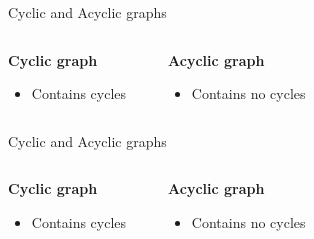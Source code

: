 \documentclass[compress]{beamer}
\begin{document}
\begin{frame}{Cyclic and Acyclic graphs}
  \begin{columns}
    \begin{block}{\textbf{Cyclic graph}}
      \begin{itemize}
        \item Contains cycles
      \end{itemize}
    \end{block}
    \begin{center}
    
  \end{center}
    \begin{block}{\textbf{Acyclic graph}}
      \begin{itemize}
        \item Contains no cycles
      \end{itemize}
    \end{block}
    \begin{center}
    
    \end{center}
  \end{columns}
\end{frame}

\begin{frame}{Cyclic and Acyclic graphs}
  \begin{columns}
    \begin{block}{\textbf{Cyclic graph}}
      \begin{itemize}
        \item Contains cycles
      \end{itemize}
    \end{block}
    \begin{center}
    
  \end{center}
    \begin{block}{\textbf{Acyclic graph}}
      \begin{itemize}
        \item Contains no cycles
      \end{itemize}
    \end{block}
    \begin{center}
    
    \end{center}
  \end{columns}
\end{frame}
\end{document}
